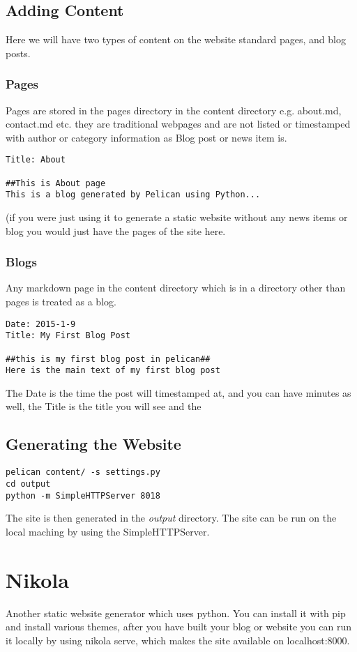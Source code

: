 \documentclass[12pt]{article}			%
\begin{document}
\subsection{Adding Content}
Here we will have two types of content on the website standard pages, and blog posts.
\subsubsection{Pages}
Pages are stored in the pages directory in the content directory e.g. about.md, contact.md etc. they are traditional webpages and are not listed or timestamped with author or category information as Blog post or news item is.

\begin{verbatim}
Title: About

##This is About page
This is a blog generated by Pelican using Python...
\end{verbatim}
(if you were just using it to generate a static website without any news items or blog you would just have the pages of the site here.

\subsubsection{Blogs}
Any markdown page in the content directory which is in a directory other than pages is treated as a blog.

\begin{verbatim}
Date: 2015-1-9
Title: My First Blog Post

##this is my first blog post in pelican##
Here is the main text of my first blog post

\end{verbatim}
The Date is the time the post will timestamped at, and you can have minutes as well, the Title is the title you will see and the
\subsection{Generating the Website}
\begin{verbatim}
pelican content/ -s settings.py
cd output
python -m SimpleHTTPServer 8018
\end{verbatim}
The site is then generated in the \textit{output} directory. The site can be run on the local maching by using the SimpleHTTPServer.


\newpage
\section{Nikola}
Another static website generator which uses python. You can install it with pip and install various themes, after you have built your blog or website you can run it locally by using nikola serve, which makes the site available on localhost:8000.
\end{document}
